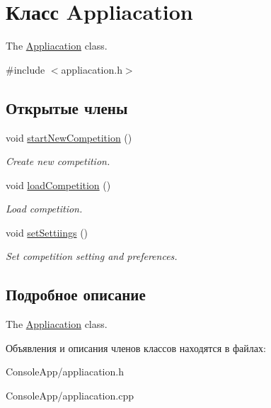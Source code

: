 \hypertarget{classAppliacation}{}\section{Класс Appliacation}
\label{classAppliacation}


The \hyperlink{classAppliacation}{Appliacation} class.  




{\ttfamily \#include $<$appliacation.\+h$>$}

\subsection*{Открытые члены}
\begin{DoxyCompactItemize}
\item 
\hypertarget{classAppliacation_a529117a5b54436706352ced6e9a81e4d}{}void \hyperlink{classAppliacation_a529117a5b54436706352ced6e9a81e4d}{start\+New\+Competition} ()\label{classAppliacation_a529117a5b54436706352ced6e9a81e4d}

\begin{DoxyCompactList}\small\item\em Create new competition. \end{DoxyCompactList}\item 
\hypertarget{classAppliacation_a66a0926ab5f247217cba5fd54504369f}{}void \hyperlink{classAppliacation_a66a0926ab5f247217cba5fd54504369f}{load\+Competition} ()\label{classAppliacation_a66a0926ab5f247217cba5fd54504369f}

\begin{DoxyCompactList}\small\item\em Load competition. \end{DoxyCompactList}\item 
\hypertarget{classAppliacation_ac20442cedab9aab65a7d75e21c3c447f}{}void \hyperlink{classAppliacation_ac20442cedab9aab65a7d75e21c3c447f}{set\+Settiings} ()\label{classAppliacation_ac20442cedab9aab65a7d75e21c3c447f}

\begin{DoxyCompactList}\small\item\em Set competition setting and preferences. \end{DoxyCompactList}\end{DoxyCompactItemize}


\subsection{Подробное описание}
The \hyperlink{classAppliacation}{Appliacation} class. 

Объявления и описания членов классов находятся в файлах\+:\begin{DoxyCompactItemize}
\item 
Console\+App/appliacation.\+h\item 
Console\+App/appliacation.\+cpp\end{DoxyCompactItemize}
